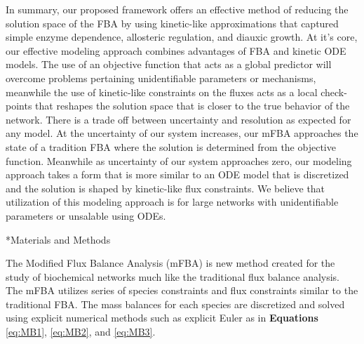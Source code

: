 \documentclass[12pt]{article}
\makeatletter
\renewcommand\section{\@startsection
	{subsection}{2}{0mm}
	{-0.2in}
	{0.05\baselineskip}
	{\normalfont\large\bfseries}}
\makeatother
\begin{document}
In summary, our proposed framework offers an effective method of reducing the solution space of the FBA by using kinetic-like approximations that captured simple enzyme dependence, allosteric regulation, and diauxic growth. At it’s core, our effective modeling approach combines advantages of FBA and kinetic ODE models. The use of an objective function that acts as a global predictor will overcome problems pertaining unidentifiable parameters or mechanisms, meanwhile the use of kinetic-like constraints on the fluxes acts as a local check-points that reshapes the solution space that is closer to the true behavior of the network. There is a trade off between uncertainty and resolution as expected for any model. At the uncertainty of our system increases, our mFBA approaches the state of a tradition FBA where the solution is determined from the objective function. Meanwhile as uncertainty of our system approaches zero, our modeling approach takes a form that is more similar to an ODE model that is discretized and the solution is shaped by kinetic-like flux constraints. We believe that utilization of this modeling approach is for large networks with unidentifiable parameters or unsalable using ODEs.  


\clearpage

\section*{Materials and Methods}

The Modified Flux Balance Analysis (mFBA) is new method created for the study of biochemical networks much like the traditional flux balance analysis. The mFBA utilizes series of species constraints and flux constraints similar to the traditional FBA. The mass balances for each species are discretized and solved using explicit numerical methods such as explicit Euler as in \textbf{Equations} \eqref{eq:MB1}, \eqref{eq:MB2}, and \eqref{eq:MB3}.
\end{document}
